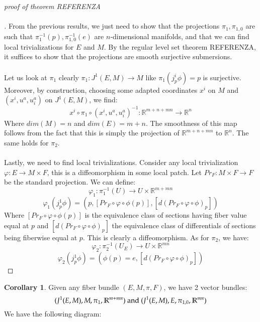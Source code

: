 \documentclass[12pt,a4paper]{report}
\theoremstyle{definition}
\theoremstyle{Theorem}
\theoremstyle{break}
\theoremstyle{definition}
\newtheorem{Cor}[Def]{Corollary}
\begin{document}
	\begin{proof}[proof of theorem REFERENZA\\\\]
		From the previous results, we just need to show that the projections $\pi_1,\pi_{1,0}$ are such that $\pi_1^{-1}(p),\pi^{-1}_{1,0}(e)$ are $n$-dimensional manifolds, and that we can find local trivializations for $E$ and $M$. By the regular level set theorem REFERENZA, it suffices to show that the projections are smooth surjective submersions.\\\\
		Let us look at $\pi_1$ clearly $\pi_1:J^1(E,M)\rightarrow M$ like $\pi_1(j^i_p\phi)=p$ is surjective. Moreover, by construction, choosing some adapted coordinates $x^i$ on $M$ and $(x^i,u^a,u^a_i)$ on $J^1(E,M)$, we find:
		$$x^i\circ \pi_1 \circ (x^i,u^a,u^a_i)^{-1}:\mathbb{R}^{m+n+mn}\rightarrow \mathbb{R}^n$$
		Where $dim(M)=n$ and $dim(E)=m+n$. The smoothness of this map follows from the fact that this is simply the projection of $\mathbb{R}^{m+n+mn}$ to $\mathbb{R}^n$. The same holds for $\pi_2$.\\
		\\
		Lastly, we need to find local trivializations. Consider any local trivialization $\varphi:E\rightarrow M\times F$, this is a diffeomorphism in some local patch. Let $Pr_F:M\times F\rightarrow F$ be the standard projection. We can define:
		$$\varphi_1:\pi_1^{-1}(U)\rightarrow U\times \mathbb{R}^{m+mn}$$
		$$\varphi_1(j^1_p\phi)=(p,[Pr_F\circ \varphi\circ\phi(p)],[d(Pr_F\circ \varphi\circ\phi)_p])$$
		Where $[Pr_F\circ \varphi\circ\phi(p)]$ is the equivalence class of sections having fiber value equal at $p$ and $[d(Pr_F\circ \varphi\circ\phi)_p]$ the equivalence class of differentials of sections being fiberwise equal at $p$. This is clearly a diffeomorphism. As for $\pi_2$, we have:
		$$\varphi_2:\pi_2^{-1}(U_E)\rightarrow U\times \mathbb{R}^{mn}$$
		$$\varphi_2(j_p^1\phi)=(\phi(p)=e,[d(Pr_F\circ \varphi\circ\phi)_p])$$
	\end{proof}
	\begin{Cor}
		Given any fiber bundle $(E,M,\pi,F)$, we have 2 vector bundles:
		$$(J^1(E,M),M,\pi_1,\mathbb{R}^{m+mn})\hbox{ and }(J^1(E,M),E,\pi_{1,0},\mathbb{R}^{mn})$$
		We have the following diagram:
		\begin{center}
		\end{center}
	\end{Cor}
\end{document}
